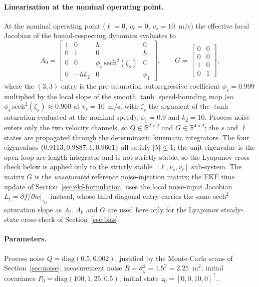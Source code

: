 \documentclass[11pt,a4paper]{article}
\begin{document}
\paragraph{Linearisation at the nominal operating point.}
At the nominal operating point ($\ell=0$, $v_\ell=0$, $v_s=10$~m/s)
the effective local Jacobian of the bound-respecting dynamics
evaluates to
\begin{equation}
A_0=\begin{bmatrix}
1 & 0 & h & 0\\
0 & 1 & 0 & h\\
0 & 0 & \phi_s\,\mathrm{sech}^2(\zeta_s) & 0\\
0 & -hk_2 & 0 & \phi_1
\end{bmatrix},
\qquad
G=\begin{bmatrix}0&0\\0&0\\1&0\\0&1\end{bmatrix},
\label{eq:A0}
\end{equation}
where the $(3,3)$ entry is the pre-saturation autoregressive
coefficient $\phi_s=0.999$ multiplied by the local slope of the
smooth $\tanh$ speed-bounding map (so $\phi_s\,\mathrm{sech}^2(\zeta_s)
\approx 0.960$ at $v_s=10$~m/s, with $\zeta_s$ the argument of
the $\tanh$ saturation evaluated at the nominal speed),
$\phi_1=0.9$ and $k_2=10$. Process noise enters only the two
velocity channels, so $Q\in\mathbb{R}^{2\times 2}$ and $G\in
\mathbb{R}^{4\times 2}$; the $s$ and $\ell$ states are propagated
through the deterministic kinematic integrators. The four
eigenvalues $\{0.9113,0.9887,1,0.9601\}$ all satisfy $|\lambda|\le1$;
the unit eigenvalue is the open-loop arc-length integrator and is not
strictly stable, so the Lyapunov cross-check below is applied only
to the strictly stable $[\ell,v_s,v_\ell]$ sub-system. The matrix
$G$ is the \emph{unsaturated} reference noise-injection matrix; the
EKF time update of Section~\ref{sec:ekf-formulation} uses the local
noise-input Jacobian $L_t=\partial f/\partial w|_{\hat{z}_{t|t}}$
instead, whose third diagonal entry carries the same
$\mathrm{sech}^2$ saturation slope as $A_t$. $A_0$ and $G$ are used
here only for the Lyapunov steady-state cross-check of
Section~\ref{sec:bias}.

\paragraph{Parameters.}
Process noise $Q=\mathrm{diag}(0.5,0.002)$, justified by the
Monte-Carlo scans of Section~\ref{sec:noise}; measurement noise
$R=\sigma_y^2=1.5^2=2.25$~m$^2$; initial covariance
$P_0=\mathrm{diag}(100,1,25,0.5)$; initial state
$z_0=[0,0,10,0]^{\!\top}$.
\end{document}
